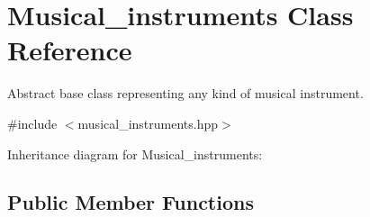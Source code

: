 \hypertarget{classMusical__instruments}{}\section{Musical\+\_\+instruments Class Reference}
\label{classMusical__instruments}


Abstract base class representing any kind of musical instrument.  




{\ttfamily \#include $<$musical\+\_\+instruments.\+hpp$>$}



Inheritance diagram for Musical\+\_\+instruments\+:
\subsection*{Public Member Functions}
